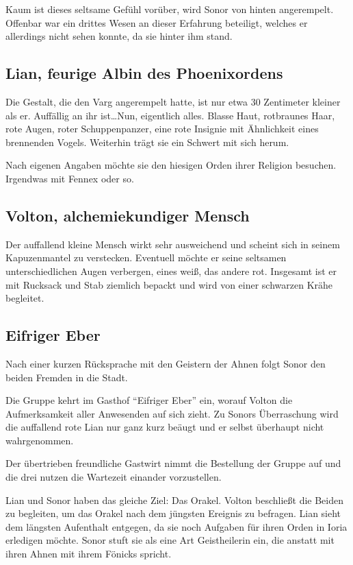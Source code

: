 \documentclass[a4paper]{scrreprt}
\begin{document}
Kaum ist dieses seltsame Gefühl vorüber, wird Sonor von hinten angerempelt. Offenbar war ein drittes Wesen an dieser Erfahrung beteiligt, welches er allerdings nicht sehen konnte, da sie hinter ihm stand.

\subsection{Lian, feurige Albin des Phoenixordens}
Die Gestalt, die den Varg angerempelt hatte, ist nur etwa 30 Zentimeter kleiner als er. Auffällig an ihr ist\ldots Nun, eigentlich alles. Blasse Haut, rotbraunes Haar, rote Augen, roter Schuppenpanzer, eine rote Insignie mit Ähnlichkeit eines brennenden Vogels. Weiterhin trägt sie ein Schwert mit sich herum.

Nach eigenen Angaben möchte sie den hiesigen Orden ihrer Religion besuchen. Irgendwas mit Fennex oder so. 

\subsection{Volton, alchemiekundiger Mensch}

Der auffallend kleine Mensch wirkt sehr ausweichend und scheint sich in seinem Kapuzenmantel zu verstecken. Eventuell möchte er seine seltsamen unterschiedlichen Augen verbergen, eines weiß, das andere rot. Insgesamt ist er mit Rucksack und Stab ziemlich bepackt und wird von einer schwarzen Krähe begleitet.

\subsection{Eifriger Eber}

Nach einer kurzen Rücksprache mit den Geistern der Ahnen folgt Sonor den beiden Fremden in die Stadt.


Die Gruppe kehrt im Gasthof \enquote{Eifriger Eber} ein, worauf Volton die Aufmerksamkeit aller Anwesenden auf sich zieht. Zu Sonors Überraschung wird die auffallend rote Lian nur ganz kurz beäugt und er selbst überhaupt nicht wahrgenommen.

Der übertrieben freundliche Gastwirt nimmt die Bestellung der Gruppe auf und die drei nutzen die Wartezeit einander vorzustellen.

Lian und Sonor haben das gleiche Ziel: Das Orakel. Volton beschließt die Beiden zu begleiten, um das Orakel nach dem jüngsten Ereignis zu befragen.
Lian sieht dem längsten Aufenthalt entgegen, da sie noch Aufgaben für ihren Orden in Ioria erledigen möchte.
Sonor stuft sie als eine Art Geistheilerin ein, die anstatt mit ihren Ahnen mit ihrem Fönicks spricht. 
\end{document}

